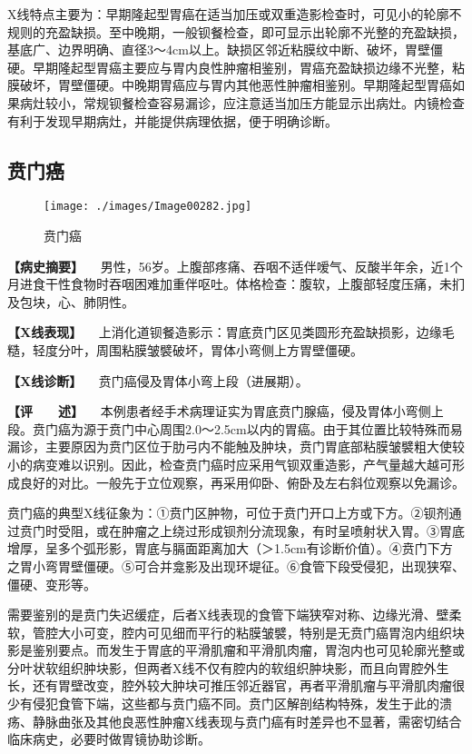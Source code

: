 X线特点主要为：早期隆起型胃癌在适当加压或双重造影检查时，可见小的轮廓不规则的充盈缺损。至中晚期，一般钡餐检查，即可显示出轮廓不光整的充盈缺损，基底广、边界明确、直径3～4cm以上。缺损区邻近粘膜纹中断、破坏，胃壁僵硬。早期隆起型胃癌主要应与胃内良性肿瘤相鉴别，胃癌充盈缺损边缘不光整，粘膜破坏，胃壁僵硬。中晚期胃癌应与胃内其他恶性肿瘤相鉴别。早期隆起型胃癌如果病灶较小，常规钡餐检查容易漏诊，应注意适当加压方能显示出病灶。内镜检查有利于发现早期病灶，并能提供病理依据，便于明确诊断。

\subsection{贲门癌}

\begin{figure}[!htbp]
 \centering
 \texttt{[image: ./images/Image00282.jpg]}
 \captionsetup{justification=centering}
 \caption{贲门癌}
 \label{fig5-3-20}
  \end{figure} 

\textbf{【病史摘要】}
　男性，56岁。上腹部疼痛、吞咽不适伴嗳气、反酸半年余，近1个月进食干性食物时吞咽困难加重伴呕吐。体格检查：腹软，上腹部轻度压痛，未扪及包块，心、肺阴性。

\textbf{【X线表现】}
　上消化道钡餐造影示：胃底贲门区见类圆形充盈缺损影，边缘毛糙，轻度分叶，周围粘膜皱襞破坏，胃体小弯侧上方胃壁僵硬。

\textbf{【X线诊断】} 　贲门癌侵及胃体小弯上段（进展期）。

\textbf{【评　　述】}
　本例患者经手术病理证实为胃底贲门腺癌，侵及胃体小弯侧上段。贲门癌为源于贲门中心周围2.0～2.5cm以内的胃癌。由于其位置比较特殊而易漏诊，主要原因为贲门区位于肋弓内不能触及肿块，贲门胃底部粘膜皱襞粗大使较小的病变难以识别。因此，检查贲门癌时应采用气钡双重造影，产气量越大越可形成良好的对比。一般先于立位观察，再采用仰卧、俯卧及左右斜位观察以免漏诊。

贲门癌的典型X线征象为：①贲门区肿物，可位于贲门开口上方或下方。②钡剂通过贲门时受阻，或在肿瘤之上绕过形成钡剂分流现象，有时呈喷射状入胃。③胃底增厚，呈多个弧形影，胃底与膈面距离加大（＞1.5cm有诊断价值）。④贲门下方之胃小弯胃壁僵硬。⑤可合并龛影及出现环堤征。⑥食管下段受侵犯，出现狭窄、僵硬、变形等。

需要鉴别的是贲门失迟缓症，后者X线表现的食管下端狭窄对称、边缘光滑、壁柔软，管腔大小可变，腔内可见细而平行的粘膜皱襞，特别是无贲门癌胃泡内组织块影是鉴别要点。而发生于胃底的平滑肌瘤和平滑肌肉瘤，胃泡内也可见轮廓光整或分叶状软组织肿块影，但两者X线不仅有腔内的软组织肿块影，而且向胃腔外生长，还有胃壁改变，腔外较大肿块可推压邻近器官，再者平滑肌瘤与平滑肌肉瘤很少有侵犯食管下端，这些都与贲门癌不同。贲门区解剖结构特殊，发生于此的溃疡、静脉曲张及其他良恶性肿瘤X线表现与贲门癌有时差异也不显著，需密切结合临床病史，必要时做胃镜协助诊断。

